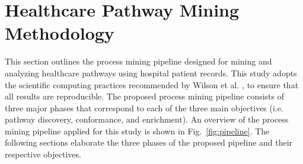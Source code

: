 
\section{Healthcare Pathway Mining Methodology}
This section outlines the process mining pipeline designed for mining and analyzing healthcare pathways using hospital patient records. This study adopts the scientific computing practices recommended by Wilson et al. \cite{Wilson2014}, \cite{Wilson2017} to ensure that all results are reproducible. The proposed process mining pipeline consists of three major phases that correspond to each of the three main objectives (i.e. pathway discovery, conformance, and enrichment). An overview of the process mining pipeline applied for this study is shown in Fig.~\ref{fig:pipeline}.  The following sections elaborate the three phases of the proposed pipeline and their respective objectives.

